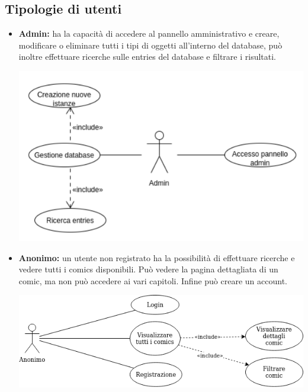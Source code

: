 \subsection{Tipologie di utenti}

\begin{itemize}
  \item \textbf{Admin:} ha la capacità di accedere al pannello amministrativo e creare,
        modificare o eliminare tutti i tipi di oggetti all’interno del database,
        può inoltre effettuare ricerche sulle entries del database e filtrare i risultati.

        \includegraphics[width=1\linewidth]{images/admin.png}

  \item \textbf{Anonimo:} un utente non registrato ha la possibilità di effettuare ricerche
        e vedere tutti i comics disponibili. Può vedere la pagina dettagliata di un comic, ma non può accedere ai vari capitoli.
        Infine può creare un account.

        \includegraphics[width=1\linewidth]{images/anonimo.png}


\end{itemize}
